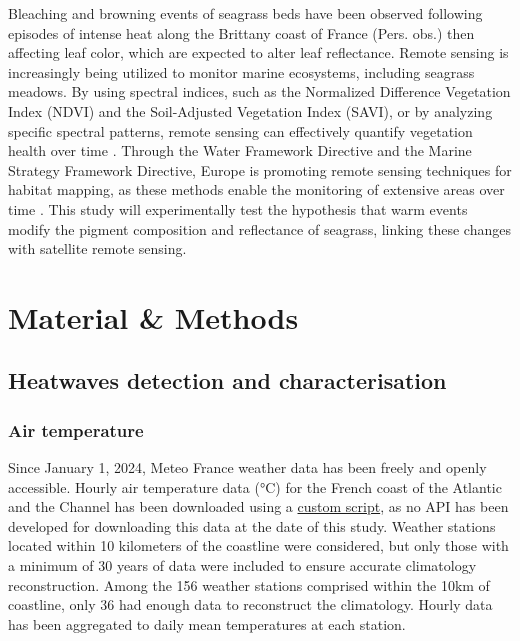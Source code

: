 \documentclass[
  number]{elsarticle}
\begin{document}
Bleaching and browning events of seagrass beds have been observed
following episodes of intense heat along the Brittany coast of France
(Pers. obs.) then affecting leaf color, which are expected to alter leaf
reflectance. Remote sensing is increasingly being utilized to monitor
marine ecosystems, including seagrass meadows. By using spectral
indices, such as the Normalized Difference Vegetation Index (NDVI) and
the Soil-Adjusted Vegetation Index (SAVI), or by analyzing specific
spectral patterns, remote sensing can effectively quantify vegetation
health over time
\citep{huete2012vegetation, kloos2021agricultural, carlan2020identifying, akbar2020mangrove}.
Through the Water Framework Directive and the Marine Strategy Framework
Directive, Europe is promoting remote sensing techniques for habitat
mapping, as these methods enable the monitoring of extensive areas over
time \citep{papathanasopoulou2019satellite}. This study will
experimentally test the hypothesis that warm events modify the pigment
composition and reflectance of seagrass, linking these changes with
satellite remote sensing.

\section{Material \& Methods}\label{material-methods}

\subsection{Heatwaves detection and
characterisation}\label{heatwaves-detection-and-characterisation}

\subsubsection{Air temperature}\label{air-temperature}

Since January 1, 2024, Meteo France weather data has been freely and
openly accessible. Hourly air temperature data (°C) for the French coast
of the Atlantic and the Channel has been downloaded using a
\href{https://github.com/SigOiry/HeatWave_Seagrasses/blob/main/MeteoFrance_Extraction.qmd}{custom
script}, as no API has been developed for downloading this data at the
date of this study. Weather stations located within 10 kilometers of the
coastline were considered, but only those with a minimum of 30 years of
data were included to ensure accurate climatology reconstruction. Among
the 156 weather stations comprised within the 10km of coastline, only 36
had enough data to reconstruct the climatology. Hourly data has been
aggregated to daily mean temperatures at each station.
\end{document}
